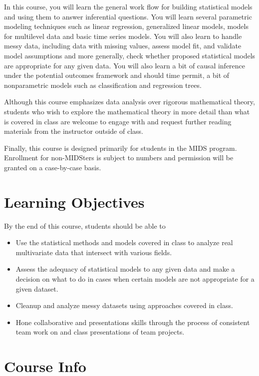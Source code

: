 \documentclass[11pt, a4paper]{article}
\begin{document}
In this course, you will learn the general work flow for building statistical models and using them to answer inferential questions. You will learn several parametric modeling techniques such as linear regression, generalized linear models, models for multilevel data and basic time series models. You will also learn to handle messy data, including data with missing values, assess model fit, and validate model assumptions and more generally, check whether proposed statistical models are appropriate for any given data. You will also learn a bit of causal inference under the potential outcomes framework and should time permit, a bit of nonparametric models such as classification and regression trees. 

Although this course emphasizes data analysis over rigorous mathematical theory, students who wish to explore the mathematical theory in more detail than what is covered in class are welcome to engage with and request further reading materials from the instructor outside of class.

Finally, this course is designed primarily for students in the MIDS program. Enrollment for non-MIDSters is subject to numbers and permission will be granted on a case-by-case basis.

\section{Learning Objectives}
By the end of this course, students should be able to
\begin{itemize}[label= {\color{darkblue}{\ArrowBoldRightStrobe}}]
	\item Use the statistical methods and models covered in class to analyze real multivariate data that intersect with various fields. 
	\item Assess the adequacy of statistical models to any given data and make a decision on what to do in cases when certain models are not appropriate for a given dataset.
	\item Cleanup and analyze messy datasets using approaches covered in class.
	\item Hone collaborative and presentations skills through the process of consistent team work on and class presentations of team projects.
\end{itemize}

\section{Course Info}
\end{document}
